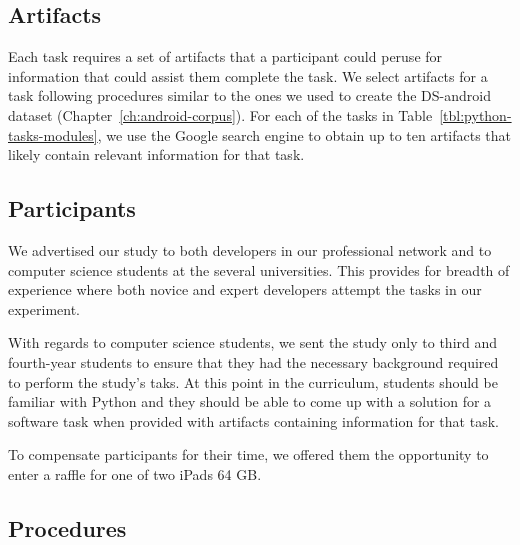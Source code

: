 







\subsection{Artifacts}
\label{sec:experiment-artifacts}


Each task requires a set of artifacts that a participant could peruse for information that could assist them complete the task.
We select artifacts for a task following procedures similar to the ones we used to create the \acs{DS-android} dataset (Chapter~\ref{ch:android-corpus}). 
For each of the tasks in Table~\ref{tbl:python-tasks-modules}, we use the Google search engine to obtain up to ten artifacts that likely contain relevant
information for that task. 






\subsection{Participants}



We advertised our study to both developers in our professional network and to computer science students at the several universities. 
This provides for breadth of experience where both novice and expert developers attempt the tasks in our experiment. 


With regards to computer science students, we sent the study only to third and fourth-year students to ensure that they had the necessary background required to perform the study's taks.
At this point in the curriculum, students should be familiar with Python and they should be able to come up with a solution 
for a software task when provided with artifacts containing information for that task.


To compensate participants for their time, we offered them the opportunity to enter a raffle for one of two iPads 64 GB.






\subsection{Procedures}
\label{cp6:evaluation-procedures}



